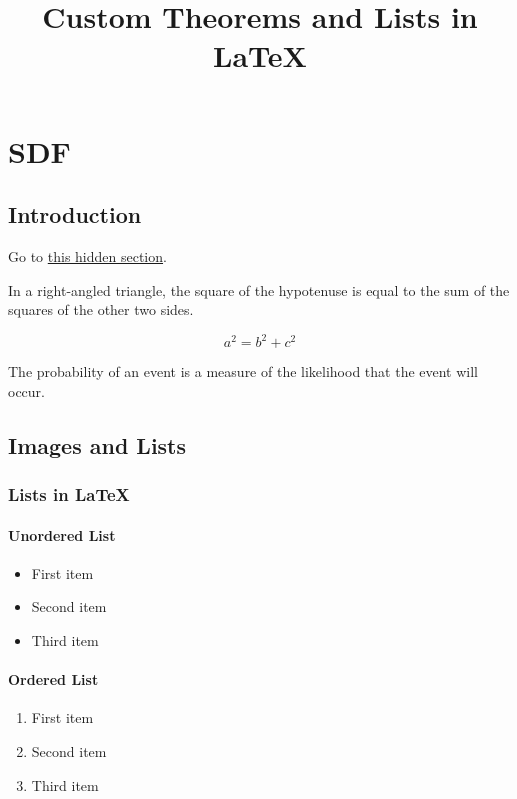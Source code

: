 \documentclass{report}
\begin{document}
\title{Custom Theorems and Lists in LaTeX}
\author{}
\date{}
\maketitle

\part{SDF}

\chapter{Introduction}


Go to \hyperref[concept:13.8]{this hidden section}.

\begin{theorem}
    In a right-angled triangle, the square of the hypotenuse is equal to the sum of the squares of the other two sides.

    $$
    a^2 = b^2 + c^2
    $$
\end{theorem}

\begin{concept}[2.1][Probability]
    The probability of an event is a measure of the likelihood that the event will occur.
\end{concept}

\chapter{Images and Lists}


\section{Lists in LaTeX}

\subsection{Unordered List}
\begin{itemize}
    \item First item
    \item Second item
    \item Third item
\end{itemize}

\subsection{Ordered List}
\begin{enumerate}
    \item First item
    \item Second item
    \item Third item
\end{enumerate}
\end{document}
